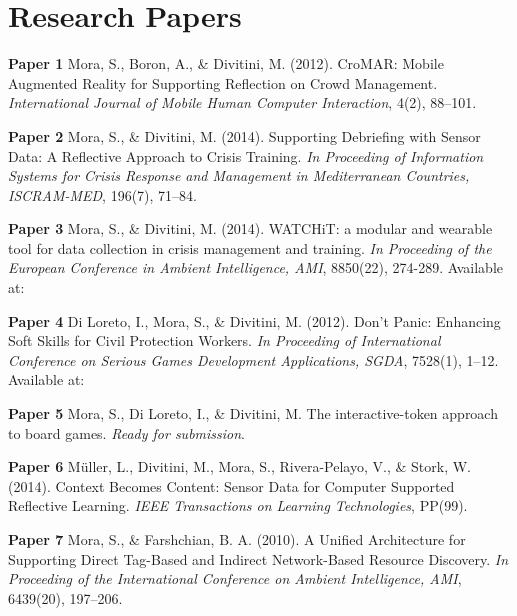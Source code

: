\chapter{Research Papers}\label{papers}

\textbf{Paper 1} Mora, S., Boron, A., \& Divitini, M. (2012). CroMAR:
Mobile Augmented Reality for Supporting Reflection on Crowd Management.
\emph{International Journal of Mobile Human Computer Interaction}, 4(2),
88--101. 

\textbf{Paper 2} Mora, S., \& Divitini, M. (2014). Supporting Debriefing
with Sensor Data: A Reflective Approach to Crisis Training. \emph{In
Proceeding of Information Systems for Crisis Response and Management in
Mediterranean Countries, ISCRAM-MED}, 196(7), 71--84. 

\textbf{Paper 3} Mora, S., \& Divitini, M. (2014). WATCHiT: a modular
and wearable tool for data collection in crisis management and training.
\emph{In Proceeding of the European Conference in Ambient Intelligence,
AMI}, 8850(22), 274-289. Available at:

\textbf{Paper 4} Di Loreto, I., Mora, S., \& Divitini, M. (2012). Don't
Panic: Enhancing Soft Skills for Civil Protection Workers. \emph{In
Proceeding of International Conference on Serious Games Development
Applications, SGDA}, 7528(1), 1--12. Available at:

\textbf{Paper 5} Mora, S., Di Loreto, I., \& Divitini, M. The
interactive-token approach to board games. \emph{Ready for submission}.

\textbf{Paper 6} Müller, L., Divitini, M., Mora, S., Rivera-Pelayo, V.,
\& Stork, W. (2014). Context Becomes Content: Sensor Data for Computer
Supported Reflective Learning. \emph{IEEE Transactions on Learning
Technologies}, PP(99). 

\textbf{Paper 7} Mora, S., \& Farshchian, B. A. (2010). A Unified
Architecture for Supporting Direct Tag-Based and Indirect Network-Based
Resource Discovery. \emph{In Proceeding of the International Conference
on Ambient Intelligence, AMI}, 6439(20), 197--206. 
